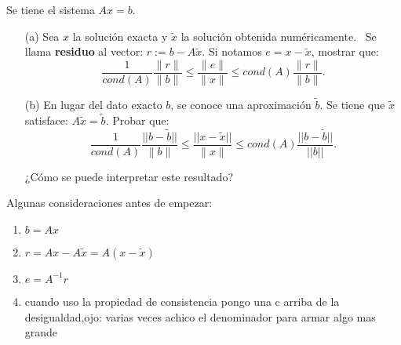 \begin{enunciado}{\ejercicio}
    Se tiene el sistema $ Ax = b $.

    \begin{itemize}
        \item[(a)] Sea \( x \) la solución exacta y \( \tilde{x} \) la solución obtenida numéricamente. \
        Se llama \textbf{residuo} al vector: $r := b - A\tilde{x}$.
        Si notamos $e = x - \tilde{x}$, mostrar que:
        $$
        \frac{1}{cond(A)}  \frac{\|r\|}{\|b\|} \leq \frac{\|e\|}{\|x\|} \leq  cond(A) \frac{\|r\|}{\|b\|}.
        $$

        \item[(b)] En lugar del dato exacto \( b \), se conoce una aproximación \( \tilde{b} \). 
        Se tiene que \( \tilde{x} \) satisface: $A\tilde{x} = \tilde{b}.$
        Probar que:
        \[
        \frac{1}{cond(A)}  \frac{||b - \tilde{b}||}{\|b\|} \leq \frac{||x - \tilde{x}||}{\|x\|} \leq cond(A)  \frac{||b - \tilde{b}||}{||b||}.
        \]
    
        ¿Cómo se puede interpretar este resultado?
    \end{itemize}
\end{enunciado}

\medskip

Algunas consideraciones antes de empezar:
\begin{enumerate}[label=(\roman*)]
\item $b = Ax$
\item $r = Ax - A\tilde{x} = A(x - \tilde{x})$
\item $e = A^{-1} r$
\item cuando uso la propiedad de consistencia pongo una c arriba de la desigualdad,ojo: varias veces achico el denominador para armar algo mas grande
\end{enumerate}

